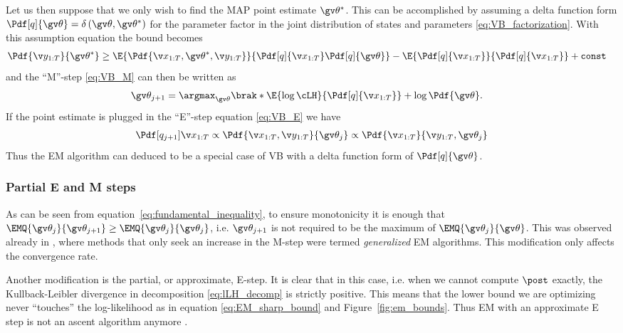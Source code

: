 Let us then suppose that we only wish to find the MAP point estimate $\Th^*$. This can be accomplished
by assuming a delta function form $\Pdf[q]{\Th}=\delta\left(\Th,\Th^*\right)$ for the parameter factor in the
joint distribution of states and parameters \eqref{eq:VB_factorization}.
With this assumption equation the bound becomes
\begin{align}
	\Pdf{\Y}{\Th^*} &\geq \E{\Pdf{\X,\Th^*,\Y}}{\Pdf[q]{\X}\Pdf[q]{\Th}} - \E{\Pdf[q]{\X}}{\Pdf[q]{\X}} + \mathtt{const}
	\label{eq:VB_MAP_boundl}
\end{align}
and the ``M''-step \eqref{eq:VB_M} can then be written as
\begin{align}
	\Th_{j+1} &= \argmax_{\Th}\brak*{\E{\log\cLH}{\Pdf[q]{\X}}+\log\Pdf{\Th}}.	
\end{align}
If the point estimate is plugged in the ``E''-step equation \eqref{eq:VB_E} we have
\begin{align}
	\Pdf[q_{j+1}]{\X}\propto \Pdf{\X,\Y}{\Th_j} \propto \Pdf{\X}{\Y,\Th_j} 	
\end{align}
Thus the EM algorithm can deduced to be a special case of VB with a delta function form
of $\Pdf[q]{\Th}$.


\subsubsection{Partial E and M steps}%
\label{sec:EM_partial}
As can be seen from equation~\eqref{eq:fundamental_inequality},
to ensure monotonicity it is enough that $\EMQ{\Th_j}{\Th_{j+1}}\geq \EMQ{\Th_{j}}{\Th_j}$,
i.e. $\Th_{j+1}$ is not required to be the maximum of $\EMQ{\Th_j}{\Th}$.
This was observed already in \textcite{Dempster1977}, where methods
that only seek an increase in the M-step were termed \emph{generalized} EM
algorithms. This modification only affects the convergence rate.

Another modification is the partial, or approximate, E-step. It is clear
that in this case, i.e. when we cannot compute $\post$ exactly, the Kullback-Leibler 
divergence in decomposition \eqref{eq:lLH_decomp} is strictly positive. This
means that the lower bound we are optimizing never ``touches'' the log-likelihood
as in equation \eqref{eq:EM_sharp_bound} and Figure~\ref{fig:em_bounds}. Thus EM with an approximate 
E step is not an ascent algorithm anymore \parencite{Goodwin2005}. 


